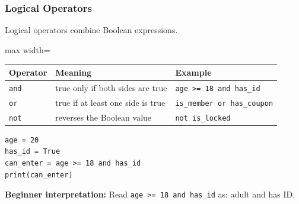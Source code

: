 \documentclass[aspectratio=169,10pt]{beamer}
\newcommand{\keyword}[1]{\textcolor{PrimaryBlue}{\textbf{#1}}}
\begin{document}
\begin{frame}[fragile]
\frametitle{Logical Operators}
\begin{tcolorbox}[lecturebox,title=Key idea]
Logical operators combine Boolean expressions.
\end{tcolorbox}

\small
\begin{adjustbox}{max width=\textwidth}
\begin{tabular}{@{}p{1.8cm}p{5.1cm}p{5.4cm}@{}}
\toprule
\textbf{Operator} & \textbf{Meaning} & \textbf{Example} \\
\midrule
\texttt{and} & true only if both sides are true & \texttt{age >= 18 and has\_id} \\
\texttt{or} & true if at least one side is true & \texttt{is\_member or has\_coupon} \\
\texttt{not} & reverses the Boolean value & \texttt{not is\_locked} \\
\bottomrule
\end{tabular}
\end{adjustbox}

\begin{lstlisting}[style=pycodesmall]
age = 20
has_id = True
can_enter = age >= 18 and has_id
print(can_enter)
\end{lstlisting}

{\small \keyword{Beginner interpretation:} Read \texttt{age >= 18 and has\_id} as: adult and has ID.}
\end{frame}
\end{document}
